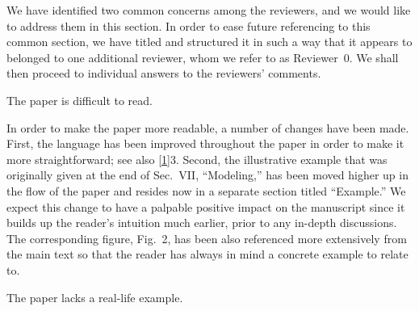 We have identified two common concerns among the reviewers, and we would like to
address them in this section. In order to ease future referencing to this common
section, we have titled and structured it in such a way that it appears to
belonged to one additional reviewer, whom we refer to as Reviewer~0. We shall
then proceed to individual answers to the reviewers' comments.

\vspace{2em}

\begin{reviewer}
 The paper is difficult to read.
\end{reviewer}

\begin{authors}
In order to make the paper more readable, a number of changes have been made.
First, the language has been improved throughout the paper in order to make it
more straightforward; see also \cref{1}{3}. Second, the illustrative example
that was originally given at the end of Sec.~VII, ``Modeling,'' has been moved
higher up in the flow of the paper and resides now in a separate section titled
``Example.'' We expect this change to have a palpable positive impact on the
manuscript since it builds up the reader's intuition much earlier, prior to any
in-depth discussions. The corresponding figure, Fig.~2, has been also referenced
more extensively from the main text so that the reader has always in mind a
concrete example to relate to.

\begin{actions}
\end{actions}
\end{authors}

\begin{reviewer}
 The paper lacks a real-life example.
\end{reviewer}

